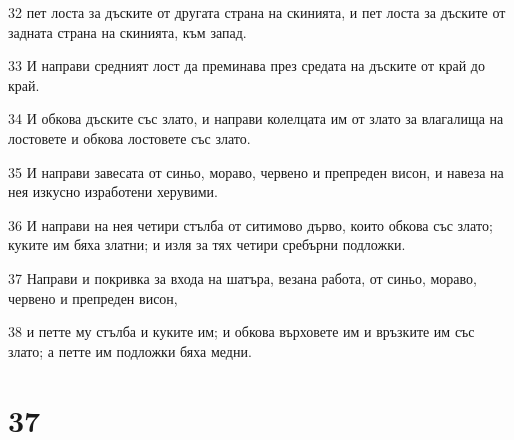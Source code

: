 \par 32 пет лоста за дъските от другата страна на скинията, и пет лоста за дъските от задната страна на скинията, към запад.
\par 33 И направи средният лост да преминава през средата на дъските от край до край.
\par 34 И обкова дъските със злато, и направи колелцата им от злато за влагалища на лостовете и обкова лостовете със злато.
\par 35 И направи завесата от синьо, мораво, червено и препреден висон, и навеза на нея изкусно изработени херувими.
\par 36 И направи на нея четири стълба от ситимово дърво, които обкова със злато; куките им бяха златни; и изля за тях четири сребърни подложки.
\par 37 Направи и покривка за входа на шатъра, везана работа, от синьо, мораво, червено и препреден висон,
\par 38 и петте му стълба и куките им; и обкова върховете им и връзките им със злато; а петте им подложки бяха медни.

\chapter{37}

